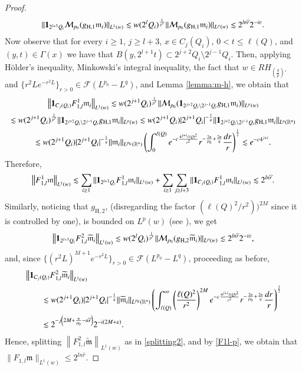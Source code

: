 \documentclass[11pt, a4paper,leqno]{amsart}
\newcommand{\mm}{\mathfrak{m}}
\renewcommand{\chi}{{\bf 1}}
\theoremstyle{plain}
\theoremstyle{definition}
\theoremstyle{remark}
\numberwithin{equation}{section}
\def \R{ \mathbb{R} }
\def \hh{ \mathrm{H} }
\begin{document}
\begin{proof}
\begin{align*}
\|\chi_{2^{l+3}Q_i}\mathcal{M}_{p_0}(g_{\hh,1}\mm_i)\|_{L^1(w)}
\lesssim w(2^{l}Q_i)^{\frac{1}{p'}}\|\mathcal{M}_{p_0}(g_{\hh,1}\mm_i)\|_{L^p(w)}\lesssim 2^{ln\widehat{r}}2^{-i\varepsilon}.
\end{align*}
Now observe that for every $i\geq 1$, $j\geq l+3$, $x\in C_{j}(Q_i)$, $0<t\leq \ell(Q)$, and $(y,t)\in \Gamma(x)$ we have that $B(y,2^{l+1}t)\subset 2^{j+2}Q_i\setminus 2^{j-1}Q_i$. Then, applying H\"older's inequality, Minkowski's integral inequality, the fact that $w\in RH_{\left(\frac{q}{p}\right)'}$ and $\{r^2Le^{-r^2L}\}_{r>0}\in \mathcal{F}(L^{p_0}-L^q)$, and Lemma \ref{lemma:m-h}, we obtain that
\begin{multline*}
\left\|\chi_{C_j(Q_i)}F_{1,l}^1\mm_i\right\|_{L^1(w)}
\lesssim
w(2^{j+1}Q_i)^{\frac{1}{p'}}\|\mathcal{M}_{p_0}(\chi_{2^{j+2}Q_i\setminus 2^{j-1}Q_i}g_{\hh,1}\mm_i)\|_{L^p(w)}
\\
\lesssim
w(2^{j+1}Q_i)^{\frac{1}{p'}}\|\chi_{2^{j+2}Q_i\setminus 2^{j-1}Q_i}g_{\hh,1}\mm_i\|_{L^p(w)}
\lesssim
w(2^{j+1}Q_i)|2^{j+1}Q_i|^{-\frac{1}{q}}\|\chi_{2^{j+2}Q_i\setminus 2^{j-1}Q_i}g_{\hh,1}\mm_i\|_{L^q(\R^n)}
\\
\lesssim
w(2^{j+1}Q_i)|2^{j+1}Q_i|^{-\frac{1}{q}}\|\mm_i\|_{L^{p_0}(\R^n)}
\left(\int_0^{\ell(Q)}e^{-c\frac{4^{j+i}\ell(Q)^2}{r^2}}r^{-\frac{2n}{p_0}+\frac{2n}{q}}\frac{dr}{r}\right)^{\frac{1}{2}}
\lesssim
e^{-c4^{j+i}}.
\end{multline*}
Therefore,
\begin{align}\label{splitting2}
\left\|F_{1,l}^1\mm\right\|_{L^1(w)}\lesssim \sum_{i\geq 1}\|\chi_{2^{l+3}Q_i}F_{1,l}^1\mm_i\|_{L^1(w)}+\sum_{i\geq 1}\sum_{j\geq l+3}\|\chi_{C_j(Q_i)}F_{1,l}^1\mm_i\|_{L^1(w)}\lesssim 2^{ln\widehat{r}}.
\end{align}
Similarly, noticing that $g_{\hh,2}$, (disregarding the factor $(\ell(Q)^2/r^2))^{2M}$ since it is controlled by one), is bounded on $L^p(w)$ (see \cite{AuscherMartell:III}), we get
$$
\left\|\chi_{2^{l+3}Q_i}F_{1,l}^2\widetilde{\mm}_i\right\|_{L^1(w)}\lesssim
 w(2^{l}Q_i)^{\frac{1}{p'}}\|\mathcal{M}_{p_0}(g_{\hh,2}\widetilde{\mm}_i)\|_{L^p(w)}\lesssim 2^{ln\widehat{r}}2^{-i\varepsilon},
$$
and, since $\{(r^2L)^{M+1}e^{-r^2L}\}_{r>0}\in \mathcal{F}(L^{p_0}-L^q)$, proceeding as before,
\begin{align*}
&\left\|\chi_{C_j(Q_i)}F_{1,l}^2\widetilde{\mm}_i\right\|_{L^1(w)}
\\
&\qquad\lesssim
w(2^{j+1}Q_i)|2^{j+1}Q_i|^{-\frac{1}{q}}\|\widetilde{\mm}_i\|_{L^{p_0}(\R^n)}
\left(\int_{\ell(Q)}^{\infty}\left(\frac{\ell(Q)^2}{r^2}\right)^{2M}e^{-c\frac{4^{j+i}\ell(Q)^2}{r^2}}r^{-\frac{2n}{p_0}+\frac{2n}{q}}\frac{dr}{r}\right)^{\frac{1}{2}}
\\&\qquad
\lesssim
2^{-j\left(2M+\frac{n}{p_0}-n\widehat{r}\right)}2^{-i(2M+\varepsilon)}.
\end{align*}
Hence, splitting $\left\|F_{1,l}^2\widetilde{\mm}\right\|_{L^1(w)}$ as in \eqref{splitting2}, and by \eqref{F1l-p}, we obtain that
$
\|F_{1,l}\mm\|_{L^1(w)}\leq 2^{ln\widehat{r}}.
$ 


\end{proof}
\end{document}
